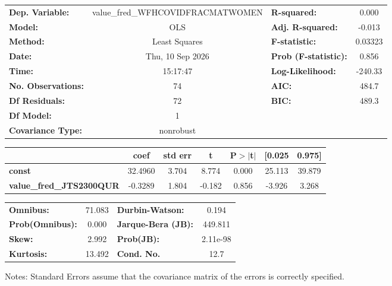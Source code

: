 \begin{center}
\begin{tabular}{lclc}
\toprule
\textbf{Dep. Variable:}          & value\_fred\_WFHCOVIDFRACMATWOMEN & \textbf{  R-squared:         } &     0.000   \\
\textbf{Model:}                  &                OLS                & \textbf{  Adj. R-squared:    } &    -0.013   \\
\textbf{Method:}                 &           Least Squares           & \textbf{  F-statistic:       } &   0.03323   \\
\textbf{Date:}                   &          Thu, 10 Sep 2026         & \textbf{  Prob (F-statistic):} &    0.856    \\
\textbf{Time:}                   &              15:17:47             & \textbf{  Log-Likelihood:    } &   -240.33   \\
\textbf{No. Observations:}       &                   74              & \textbf{  AIC:               } &     484.7   \\
\textbf{Df Residuals:}           &                   72              & \textbf{  BIC:               } &     489.3   \\
\textbf{Df Model:}               &                    1              & \textbf{                     } &             \\
\textbf{Covariance Type:}        &             nonrobust             & \textbf{                     } &             \\
\bottomrule
\end{tabular}
\begin{tabular}{lcccccc}
                                 & \textbf{coef} & \textbf{std err} & \textbf{t} & \textbf{P$> |$t$|$} & \textbf{[0.025} & \textbf{0.975]}  \\
\midrule
\textbf{const}                   &      32.4960  &        3.704     &     8.774  &         0.000        &       25.113    &       39.879     \\
\textbf{value\_fred\_JTS2300QUR} &      -0.3289  &        1.804     &    -0.182  &         0.856        &       -3.926    &        3.268     \\
\bottomrule
\end{tabular}
\begin{tabular}{lclc}
\textbf{Omnibus:}       & 71.083 & \textbf{  Durbin-Watson:     } &    0.194  \\
\textbf{Prob(Omnibus):} &  0.000 & \textbf{  Jarque-Bera (JB):  } &  449.811  \\
\textbf{Skew:}          &  2.992 & \textbf{  Prob(JB):          } & 2.11e-98  \\
\textbf{Kurtosis:}      & 13.492 & \textbf{  Cond. No.          } &     12.7  \\
\bottomrule
\end{tabular}
\end{center}

Notes: \newline
 [1] Standard Errors assume that the covariance matrix of the errors is correctly specified.